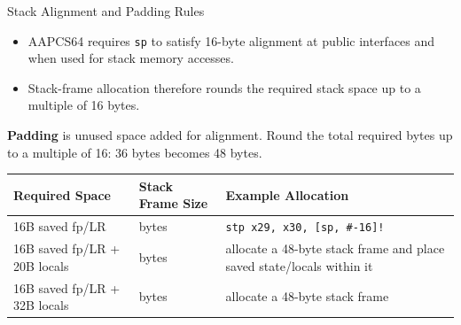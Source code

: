 \documentclass[aspectratio=169,11pt,t]{beamer}
\newcommand{\key}[1]{\textbf{#1}}
\newcommand{\bits}[1]{\texttt{#1}}
\newcommand{\code}[1]{\texttt{#1}}
\begin{document}
\begin{frame}{Stack Alignment and Padding Rules}
\begin{itemize}\setlength{\itemsep}{4pt}
  \item AAPCS64 requires \bits{sp} to satisfy 16-byte alignment at public interfaces and when used for stack memory accesses.
  \item Stack-frame allocation therefore rounds the required stack space up to a multiple of 16 bytes.
\end{itemize}
\vspace{0.1cm}
\small
\key{Padding} is unused space added for alignment. Round the total required bytes up to a multiple of 16: 36 bytes becomes 48 bytes.

\vspace{0.1cm}
\begin{center}
\footnotesize
\renewcommand{\arraystretch}{1.12}
\begin{tabular}{>{\raggedright\arraybackslash}p{} >{\raggedright\arraybackslash}p{} >{\raggedright\arraybackslash}p{}}
\toprule
\rowcolor{lightblue}
\textbf{Required Space} & \textbf{Stack Frame Size} & \textbf{Example Allocation} \\
\midrule
16B saved fp/LR & 16 bytes & \code{stp x29, x30, [sp, \#-16]!} \\
16B saved fp/LR + 20B locals & 48 bytes & allocate a 48-byte stack frame and place saved state/locals within it \\
16B saved fp/LR + 32B locals & 48 bytes & allocate a 48-byte stack frame \\
\bottomrule
\end{tabular}
\end{center}
\end{frame}
\end{document}
